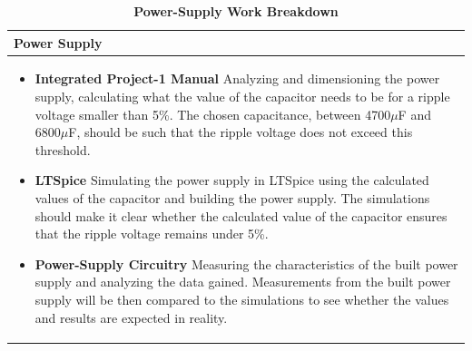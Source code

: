 \begin{table}[h!]
\centering
\captionsetup{justification=centering, labelfont=bf}
\caption{\textbf{Power-Supply Work Breakdown}}
\begin{tabular*}{\textwidth}{@{\extracolsep{\fill}} p{} @{}} 
\toprule
     \textbf{Power Supply} \\
     \midrule
    \begin{itemize}
        \item \textbf{Integrated Project-1 Manual} \newline Analyzing and dimensioning the power supply, calculating what the value of the capacitor needs to be for a ripple voltage smaller than 5\%. The chosen capacitance, between 4700$\mu$F and 6800$\mu$F, should be such that the ripple voltage does not exceed this threshold.
        \item \textbf{LTSpice} \newline Simulating the power supply in LTSpice using the calculated values of the capacitor and building the power supply. The simulations should make it clear whether the calculated value of the capacitor ensures that the ripple voltage remains under 5\%.
        \item \textbf{Power-Supply Circuitry} \newline Measuring the characteristics of the built power supply and analyzing the data gained. Measurements from the built power supply will be then compared to the simulations to see whether the values and results are expected in reality.
    \end{itemize} \\
     \bottomrule
\end{tabular*}

\label{tab:PS Work Breakdown}
\end{table}


